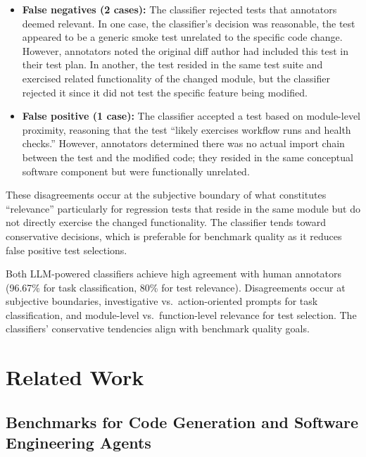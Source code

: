 \begin{itemize}
    \item \textbf{False negatives (2 cases):} The classifier rejected tests that annotators deemed relevant. In one case, the classifier's decision was reasonable, the test appeared to be a generic smoke test unrelated to the specific code change. However, annotators noted the original diff author had included this test in their test plan. In another, the test resided in the same test suite and exercised related functionality of the changed module, but the classifier rejected it since it did not test the specific feature being modified.
    \item \textbf{False positive (1 case):} The classifier accepted a test based on module-level proximity, reasoning that the test ``likely exercises workflow runs and health checks.'' However, annotators determined there was no actual import chain between the test and the modified code; they resided in the same conceptual software component but were functionally unrelated.
\end{itemize}

These disagreements occur at the subjective boundary of what constitutes ``relevance'' particularly for regression tests that reside in the same module but do not directly exercise the changed functionality. The classifier tends toward conservative decisions, which is preferable for benchmark quality as it reduces false positive test selections.

\begin{insight}
Both LLM-powered classifiers achieve high agreement with human annotators (96.67\% for task classification, 80\% for test relevance). Disagreements occur at subjective boundaries, investigative vs.\ action-oriented prompts for task classification, and module-level vs.\ function-level relevance for test selection. The classifiers' conservative tendencies align with benchmark quality goals.
\end{insight}

\section{Related Work}
\label{sec:related}

\subsection{Benchmarks for Code Generation and Software Engineering Agents}

